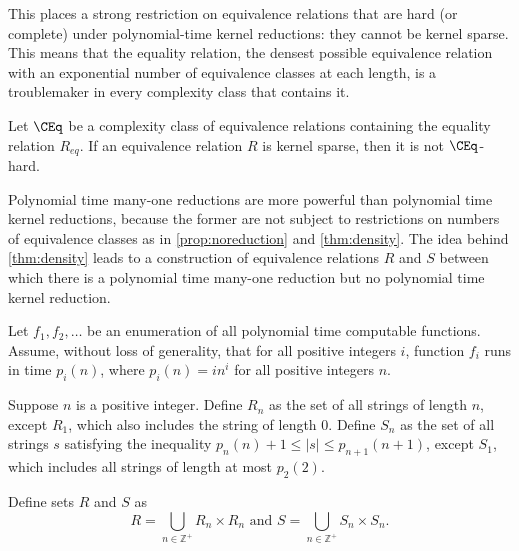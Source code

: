 This places a strong restriction on equivalence relations that are hard (or complete) under polynomial-time kernel reductions: they cannot be kernel sparse.
This means that the equality relation, the densest possible equivalence relation with an exponential number of equivalence classes at each length, is a troublemaker in every complexity class that contains it.

\begin{corollary}
  Let $\CEq$ be a complexity class of equivalence relations containing the equality relation $R_{eq}$.
  If an equivalence relation $R$ is kernel sparse, then it is not $\CEq$-hard.
\end{corollary}

Polynomial time many-one reductions are more powerful than polynomial time kernel reductions, because the former are not subject to restrictions on numbers of equivalence classes as in \autoref{prop:noreduction} and \autoref{thm:density}.
The idea behind \autoref{thm:density} leads to a construction of equivalence relations $R$ and $S$ between which there is a polynomial time many-one reduction but no polynomial time kernel reduction.

\begin{construction}\label{con:rands}
  Let $f_1, f_2, \dotsc$ be an enumeration of all polynomial time computable functions.
  Assume, without loss of generality, that for all positive integers $i$, function $f_i$ runs in time $p_i(n)$, where $p_i(n) = i n^i$ for all positive integers $n$.

  Suppose $n$ is a positive integer.
  Define $R_n$ as the set of all strings of length $n$, except $R_1$, which also includes the string of length $0$.
  Define $S_n$ as the set of all strings $s$ satisfying the inequality $p_n(n) + 1 \leq |s| \leq p_{n + 1}(n + 1)$, except $S_1$, which includes all strings of length at most $p_2(2)$.

  Define sets $R$ and $S$ as
  \begin{equation*}
    R = \bigcup_{n \in \mathbb{Z}^+} R_n \times R_n \text{ and } S = \bigcup_{n \in \mathbb{Z}^+} S_n \times S_n.
  \end{equation*}
\end{construction}

